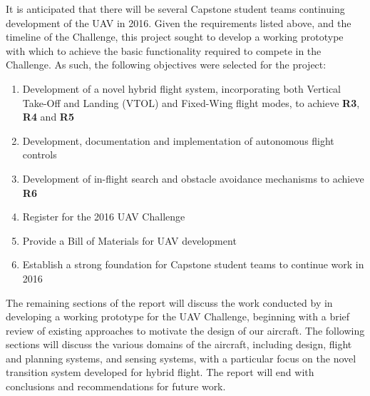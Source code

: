 It is anticipated that there will be several Capstone student teams continuing development of the UAV in 2016. Given the requirements listed above, and the timeline of the Challenge, this project sought to develop a working prototype with which to achieve the basic functionality required to compete in the Challenge. As such, the following objectives were selected for the project:
\begin{enumerate}[label=\bfseries O\arabic*:] \itemsep-2pt
	\item Development of a novel hybrid flight system, incorporating both Vertical Take-Off and Landing (VTOL) and Fixed-Wing flight modes, to achieve \textbf{R3}, \textbf{R4} and \textbf{R5}
	\item Development, documentation and implementation of autonomous flight controls
	\item Development of in-flight search and obstacle avoidance mechanisms to achieve \textbf{R6}
	\item Register for the 2016 UAV Challenge
	\item Provide a Bill of Materials for UAV development
	\item Establish a strong foundation for Capstone student teams to continue work in 2016
\end{enumerate}

The remaining sections of the report will discuss the work conducted by \ID in developing a working prototype for the UAV Challenge, beginning with a brief review of existing approaches to motivate the design of our aircraft. The following sections will discuss the various domains of the aircraft, including design, flight and planning systems, and sensing systems, with a particular focus on the novel transition system developed for hybrid flight. The report will end with conclusions and recommendations for future work.